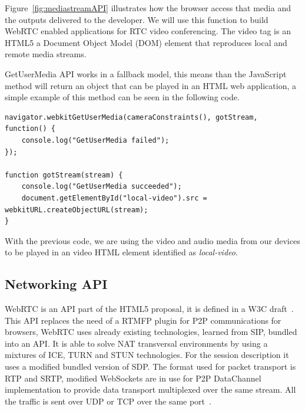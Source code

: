 Figure~\ref{fig:mediastreamAPI} illustrates how the browser access that media and the outputs delivered to the developer. We will use this function to build WebRTC enabled applications for RTC video conferencing. The video tag is an HTML5 a Document Object Model (DOM)  element that reproduces local and remote media streams.

GetUserMedia API works in a fallback model, this means than the JavaScript method will return an object that can be played in an HTML web application, a simple example of this method can be seen in the following code.

\lstset{language=JavaScript}
\begin{lstlisting}[caption=Simple example of video and audio access using JavaScript]
navigator.webkitGetUserMedia(cameraConstraints(), gotStream, function() {
	console.log("GetUserMedia failed");
});
    
function gotStream(stream) {
	console.log("GetUserMedia succeeded");
  	document.getElementById("local-video").src = webkitURL.createObjectURL(stream);
}
\end{lstlisting}

With the previous code, we are using the video and audio media from our devices to be played in an video HTML element identified as {\it local-video}. 


\subsection{Networking API}

WebRTC is an API part of the HTML5 proposal, it is defined in a W3C draft~\cite{webrtcW3cgroup}. This API replaces the need of a RTMFP plugin for P2P communications for browsers, WebRTC uses already existing technologies, learned from SIP, bundled into an API. It is able to solve NAT transversal environments by using a mixtures of ICE, TURN and STUN technologies. For the session description it uses a modified bundled version of SDP. The format used for packet transport is RTP and SRTP, modified WebSockets are in use for P2P DataChannel implementation to provide data transport multiplexed over the same stream. All the traffic is sent over UDP or TCP over the same port~\cite{alvestrandOverview2012}.

